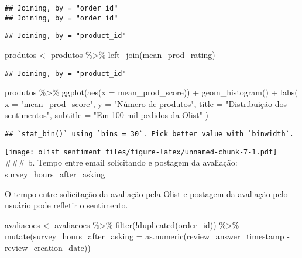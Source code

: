 \documentclass[
]{article}
\newenvironment{Shaded}{\begin{snugshade}}{\end{snugshade}}
\newcommand{\AttributeTok}[1]{\textcolor[rgb]{0.77,0.63,0.00}{#1}}
\newcommand{\FunctionTok}[1]{\textcolor[rgb]{0.00,0.00,0.00}{#1}}
\newcommand{\NormalTok}[1]{#1}
\newcommand{\OtherTok}[1]{\textcolor[rgb]{0.56,0.35,0.01}{#1}}
\newcommand{\SpecialCharTok}[1]{\textcolor[rgb]{0.00,0.00,0.00}{#1}}
\newcommand{\StringTok}[1]{\textcolor[rgb]{0.31,0.60,0.02}{#1}}
\begin{document}
\begin{verbatim}
## Joining, by = "order_id"
## Joining, by = "order_id"
\end{verbatim}

\begin{verbatim}
## Joining, by = "product_id"
\end{verbatim}

\begin{Shaded}
\begin{Highlighting}[]
\NormalTok{produtos }\OtherTok{\textless{}{-}}\NormalTok{ produtos }\SpecialCharTok{\%\textgreater{}\%}
  \FunctionTok{left\_join}\NormalTok{(mean\_prod\_rating)}
\end{Highlighting}
\end{Shaded}

\begin{verbatim}
## Joining, by = "product_id"
\end{verbatim}

\begin{Shaded}
\begin{Highlighting}[]
\NormalTok{produtos }\SpecialCharTok{\%\textgreater{}\%}
  \FunctionTok{ggplot}\NormalTok{(}\FunctionTok{aes}\NormalTok{(}\AttributeTok{x =}\NormalTok{ mean\_prod\_score)) }\SpecialCharTok{+}
  \FunctionTok{geom\_histogram}\NormalTok{() }\SpecialCharTok{+} 
  \FunctionTok{labs}\NormalTok{(}
    \AttributeTok{x =} \StringTok{"mean\_prod\_score"}\NormalTok{,}
    \AttributeTok{y =} \StringTok{"Número de produtos"}\NormalTok{,}
    \AttributeTok{title =} \StringTok{"Distribuição dos sentimentos"}\NormalTok{,}
    \AttributeTok{subtitle =} \StringTok{"Em 100 mil pedidos da Olist"}
\NormalTok{  )}
\end{Highlighting}
\end{Shaded}

\begin{verbatim}
## `stat_bin()` using `bins = 30`. Pick better value with `binwidth`.
\end{verbatim}

\texttt{[image: olist\_sentiment\_files/figure-latex/unnamed-chunk-7-1.pdf]}
\#\#\# b. Tempo entre email solicitando e postagem da avaliação:
survey\_hours\_after\_asking

O tempo entre solicitação da avaliação pela Olist e postagem da
avaliação pelo usuário pode refletir o sentimento.

\begin{Shaded}
\begin{Highlighting}[]
\NormalTok{avaliacoes }\OtherTok{\textless{}{-}}\NormalTok{ avaliacoes }\SpecialCharTok{\%\textgreater{}\%}
  \FunctionTok{filter}\NormalTok{(}\SpecialCharTok{!}\FunctionTok{duplicated}\NormalTok{(order\_id)) }\SpecialCharTok{\%\textgreater{}\%}
  \FunctionTok{mutate}\NormalTok{(}\AttributeTok{survey\_hours\_after\_asking =} \FunctionTok{as.numeric}\NormalTok{(review\_answer\_timestamp }\SpecialCharTok{{-}}\NormalTok{ review\_creation\_date))}
\end{Highlighting}
\end{Shaded}
\end{document}
